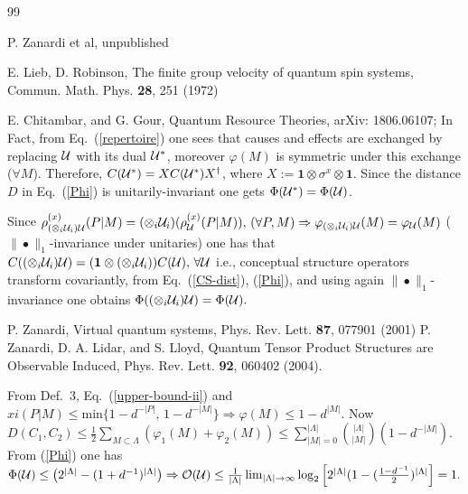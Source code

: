 \documentclass[aps,pra,groupaddress]{revtex4-1}
\begin{document}
\begin{thebibliography}{99}

 P. Zanardi et al, unpublished

 E. Lieb, D. Robinson, The finite group velocity of quantum spin systems, Commun. Math. Phys. {\bf{28}}, 251 (1972)


 E. Chitambar, and G. Gour, Quantum Resource Theories, arXiv: 1806.06107;
 In Fact, from Eq.~(\ref{repertoire}) one sees that causes and effects are exchanged by replacing $\cal U$ with its dual ${\cal U}^*$,
moreover $\varphi(M)$ is symmetric under this exchange ($\forall M$). Therefore, $C({\cal U}^*)=X C({\cal U}^*) X^\dagger$,
where $X:={\mathbf{1}}\otimes \sigma^x\otimes {\mathbf{1}}$. Since the distance $D$ in Eq.~(\ref{Phi}) is unitarily-invariant one gets $\Phi({\cal U}^*)=\Phi({\cal U})$.

 Since $\rho^{(x)}_{(\otimes_i{\cal U}_i){\cal U} }(P|M)=(\otimes_i{\cal U}_i)(\rho^{(x)}_{{\cal U} }(P|M)),\,(\forall P,M)\Rightarrow\varphi_{(\otimes_i{\cal U}_i){\cal U} }(M)=
\varphi_{{\cal U} }(M)$ ($\|\bullet\|_1$-invariance under unitaries) one has that $C((\otimes_i{\cal U}_i){\cal U})=({\mathbf{1}}\otimes (\otimes_i{\cal U}_i))C({\cal U}),\,\forall{\cal U}$
i.e., conceptual structure operators transform covariantly, from Eq.~(\ref{CS-dist}), (\ref{Phi}), and using again  $\|\bullet\|_1$-invariance one obtains $\Phi((\otimes_i{\cal U}_i){\cal U})=\Phi({\cal U}).$

 P. Zanardi, Virtual quantum systems, Phys. Rev. Lett. {\bf{87}}, 077901 (2001)
 P. Zanardi, D. A. Lidar, and S. Lloyd, Quantum Tensor Product Structures are Observable Induced, Phys. Rev. Lett. {\bf{92}}, 060402 (2004).

From Def.~3, Eq.~(\ref{upper-bound-ii}) and $xi(P|M)\le {\mathrm{min}} \{ 1-d^{-|P|},\,1- d^{-|M|}\}\Rightarrow\varphi(M)\le 1-d^{|M|}$.
Now $D(C_1, C_2)\le \frac{1}{2}\sum_{M\subset \Lambda} (\varphi_1(M)+\varphi_2(M))\le \sum_{|M|=0}^{|\Lambda|}{|\Lambda|\choose |M|} (1-d^{-|M|})$. 
From (\ref{Phi}) one has  $\Phi({\cal U})\le  \left( 2^{|\Lambda|}  -(1+d^{-1})^{|\Lambda|}\right)\Rightarrow \mathcal{O}({\cal U})\le\frac{1}{|\Lambda|}\lim_{|\Lambda|\to\infty}\log_2\left[2^{|\Lambda|}(1-(\frac{1-d^{-1}}{2})^{|\Lambda|}\right]= 1.$


\end{thebibliography}
\end{document}
